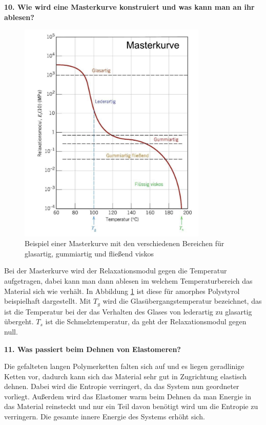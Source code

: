 \noindent\textbf{10. Wie wird eine Masterkurve konstruiert und was kann man an ihr ablesen?}\\
\begin{addmargin}[25pt]{0pt}
\begin{figure}[h]
    \centering
    \includegraphics[width = 0.8\textwidth]{images/Materialwissenschaften/Masterkurve.jpeg}
    \caption{Beispiel einer Masterkurve mit den verschiedenen Bereichen für glasartig, gummiartig und fließend viskos}
    \label{fig:Masterkurve}
\end{figure}
Bei der Masterkurve wird der Relaxationsmodul gegen die Temperatur aufgetragen, dabei kann man dann ablesen im welchem Temperaturbereich das Material sich wie verhält. In Abbildung \ref{fig:Masterkurve} ist diese für amorphes Polystyrol beispielhaft dargestellt. Mit $T_g$ wird die Glasübergangstemperatur bezeichnet, das ist die Temperatur bei der das Verhalten des Glases von lederartig zu glasartig übergeht. $T_s$ ist die Schmelztemperatur, da geht der Relaxationsmodul gegen null.\\
\end{addmargin}

\noindent\textbf{11. Was passiert beim Dehnen von Elastomeren?}\\
\begin{addmargin}[25pt]{0pt}
Die gefalteten langen Polymerketten falten sich auf und es liegen geradlinige Ketten vor, dadurch kann sich das Material sehr gut in Zugrichtung elastisch dehnen. Dabei wird die Entropie verringert, da das System nun geordneter vorliegt. Außerdem wird das Elastomer warm beim Dehnen da man Energie in das Material reinsteckt und nur ein Teil davon benötigt wird um die Entropie zu verringern. Die gesamte innere Energie des Systems erhöht sich.\\
\end{addmargin}

